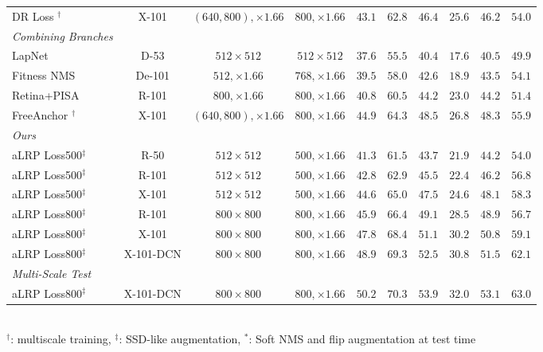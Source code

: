 \documentclass{article}
\begin{document}
\begin{table}[t]
\begin{tabular}{|l|c|c|c|c|c|c|c|c|c|}
DR Loss \cite{DRLoss}$^\dagger$&X-101&$(640, 800), \times 1.66$&$800, \times 1.66$&$43.1$&$62.8$&$46.4$&$25.6$&$46.2$&$54.0$\\        
        \hhline{==========}
        \textit{Combining Branches}& & & & & & & & &\\
        LapNet \cite{LapNet}&D-53&$512 \times 512$&$512 \times 512$&$37.6$&$55.5$&$40.4$&$17.6$&$40.5$&$49.9$\\ 
        Fitness NMS \cite{BoundedIoU}&De-101&$512, \times 1.66$&$768, \times 1.66$&$39.5$&$58.0$&$42.6$&$18.9$&$43.5$&$54.1$\\ 
        Retina+PISA \cite{PrimeSample}&R-101&$800, \times 1.66$&$800, \times 1.66$&$40.8$&$60.5$&$44.2$&$23.0$&$44.2$&$51.4$\\
        FreeAnchor \cite{FreeAnchor}$^\dagger$&X-101&$(640, 800), \times 1.66$&$800, \times 1.66$&$44.9$&$64.3$&$48.5$&$26.8$&$48.3$&$55.9$\\
        \hhline{==========}
        \textit{Ours}& & & & & & & & &\\
aLRP Loss500$^\ddagger$&R-50&$512 \times 512$&$500, \times 1.66$&$41.3$&$61.5$&$43.7$&$21.9$&$44.2$&$54.0$\\  
        aLRP Loss500$^\ddagger$&R-101&$512 \times 512$&$500, \times 1.66$&$42.8$&$62.9$&$45.5$&$22.4$&$46.2$&$56.8$\\  
aLRP Loss500$^\ddagger$&X-101&$512 \times 512$&$500, \times 1.66$&$44.6$&$65.0$&$47.5$&$24.6$&$48.1$&$58.3$  \\
aLRP Loss800$^\ddagger$&R-101&$800 \times 800$&$800, \times 1.66$&$45.9$&$66.4$&$49.1$&$28.5$&$48.9$&$56.7$\\ 
aLRP Loss800$^\ddagger$&X-101&$800 \times 800$&$800, \times 1.66$&$47.8$&$68.4$&$51.1$&$30.2$&$50.8$&$59.1$ \\ 
        aLRP Loss800$^\ddagger$&X-101-DCN&$800 \times 800$&$800, \times 1.66$&$\mathbf{48.9}$&$\mathbf{69.3}$&$\mathbf{52.5}$&$\mathbf{30.8}$&$\mathbf{51.5}$&$\mathbf{62.1}$ \\ 
        \hline
\hhline{==========}
        \textit{Multi-Scale Test}& & & & & & & & &\\
        aLRP Loss800$^\ddagger$&X-101-DCN&$800 \times 800$&$800, \times 1.66$&$50.2$&$70.3$&$53.9$&$32.0$&$53.1$&$63.0$\\ 
        \hline        
    \end{tabular}
    {\\ \footnotesize $^\dagger$: multiscale training, $^\ddagger$: SSD-like augmentation, $^*$: Soft NMS \cite{SoftNMS} and flip augmentation at test time}
\end{table}
\end{document}
